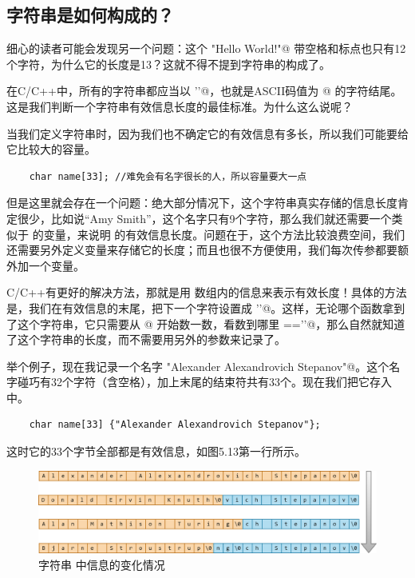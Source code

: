 \subsection*{字符串是如何构成的？}
细心的读者可能会发现另一个问题：这个 \lstinline@"Hello World!"@ 带空格和标点也只有12个字符，为什么它的长度是13？这就不得不提到字符串的构成了。\par
在C/C++中，所有的字符串都应当以 \lstinline@'\0'@，也就是ASCII码值为 @ 的字符结尾。这是我们判断一个字符串有效信息长度的最佳标准。为什么这么说呢？\par
当我们定义字符串时，因为我们也不确定它的有效信息有多长，所以我们可能要给它比较大的容量。
\begin{lstlisting}
    char name[33]; //难免会有名字很长的人，所以容量要大一点
\end{lstlisting}
但是这里就会存在一个问题：绝大部分情况下，这个字符串真实存储的信息长度肯定很少，比如说``Amy Smith''，这个名字只有9个字符，那么我们就还需要一个类似于 \lstinline@size@ 的变量，来说明 \lstinline@name@ 的有效信息长度。问题在于，这个方法比较浪费空间，我们还需要另外定义变量来存储它的长度；而且也很不方便使用，我们每次传参都要额外加一个变量。\par
C/C++有更好的解决方法，那就是用 \lstinline@name@ 数组内的信息来表示有效长度！具体的方法是，我们在有效信息的末尾，把下一个字符设置成 \lstinline@'\0'@。这样，无论哪个函数拿到了这个字符串，它只需要从 \lstinline@name[0]@ 开始数一数，看数到哪里 \lstinline@name[i]=='\0'@，那么自然就知道了这个字符串的长度，而不需要用另外的参数来记录了。\par
举个例子，现在我记录一个名字 \lstinline@"Alexander Alexandrovich Stepanov"@。这个名字碰巧有32个字符（含空格），加上末尾的结束符共有33个。现在我们把它存入 \lstinline@name@ 中。
\begin{lstlisting}
    char name[33] {"Alexander Alexandrovich Stepanov"};
\end{lstlisting}
这时它的33个字节全部都是有效信息，如图5.13第一行所示。\par
\begin{figure}[htbp]
    \centering
    \includegraphics[width=\textwidth]{../images/generalized_parts/05_Information_in_the_string.drawio.png}
    \caption{字符串 \lstinline@name@ 中信息的变化情况}
\end{figure}
